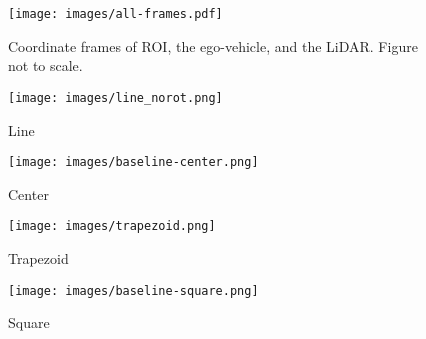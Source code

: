 \documentclass[10pt,twocolumn,letterpaper]{article}
\begin{document}
\begin{figure}[t]
\begin{center}
 \texttt{[image: images/all-frames.pdf]}
\end{center}
\vspace*{-5mm}
   \caption{Coordinate frames of ROI, the ego-vehicle, and the LiDAR. Figure not to scale.}
\label{fig:all-frames}
\vspace*{-4mm}
\end{figure}

\begin{figure*}[t]
  \centering
    \begin{subfigure}[b]{0.23\textwidth}
  \texttt{[image: images/line\_norot.png]}
                \caption{Line}
    \end{subfigure}%
    \begin{subfigure}[b]{0.23\textwidth}
  \texttt{[image: images/baseline-center.png]}
                \caption{Center}
    \end{subfigure}%
    \begin{subfigure}[b]{0.23\textwidth}
  \texttt{[image: images/trapezoid.png]}
                \caption{Trapezoid}
    \end{subfigure}%
    \begin{subfigure}[b]{0.23\textwidth}
  \texttt{[image: images/baseline-square.png]}
                \caption{Square}
    \end{subfigure}%


\end{figure*}
\end{document}
